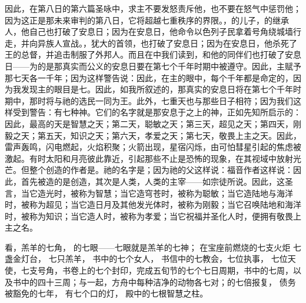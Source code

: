 因此，在第八日的第六篇圣咏中，求主不要发怒责斥他，也不要在怒气中惩罚他；因为这正是那未来审判的第八日，它将超越七重秩序的界限。，的儿子，的继承人，他自己也打破了安息日；因为在安息日，他命令以色列子民拿着号角绕城墙行走，并向异族人宣战。，犹大的首领，也打破了安息日；因为在安息日，他杀死了王的总督，并追击制服了外邦人。而且在中我们读到，和他的同伴们也打破了安息日——为的是那真实而公义的安息日要在第七个千年时期中被遵守。因此，主赋予那七天各一千年；因为这样警告说：因此，在主的眼中，每个千年都是命定的，因为我发现主的眼目是七。因此，如我所叙述的，那真实的安息日将在第七个千年时期中，那时将与祂的选民一同为王。此外，七重天也与那些日子相符；因为我们这样受到警告：有七种神。它们的名字就是那安息于之上的神，正如先知所启示的：因此，最高的天是智慧之天；第二天，聪敏之天；第三天，超见之天；第四天，刚毅之天；第五天，知识之天；第六天，孝爱之天；第七天，敬畏上主之天。因此，雷声轰鸣，闪电燃起，火焰积聚；火箭出现，星宿闪烁，由可怕彗星引起的焦虑被激起。有时太阳和月亮彼此靠近，引起那些不止是恐怖的现象，在其视域中放射光芒。但整个创造的作者是。祂的名字是；因为祂的父这样说：福音作者这样说：因此，首先被造的是创造，其次是人类，人类的主宰——如宗徒所说。因此，这圣言，当它造光时，被称为智慧；当它造穹苍时，被称为聪敏；当它造陆地与海洋时，被称为超见；当它造日月及其他发光体时，被称为刚毅；当它召唤陆地和海洋时，被称为知识；当它造人时，被称为孝爱；当它祝福并圣化人时，便拥有敬畏上主之名。\par

看，羔羊的七角， 的七眼——七眼就是羔羊的七神； 在宝座前燃烧的七支火炬 七盏金灯台， 七只羔羊， 书中的七个女人， 书信中的七教会，七位执事， 七位天使，七支号角，书卷上的七个封印，完成五旬节的七个七日周期，书中的七周，以及书中的四十三周；与一起，方舟中每种洁净的动物各七对；的七倍报复， 债务被豁免的七年， 有七个口的灯， 殿中的七根智慧之柱。\par

